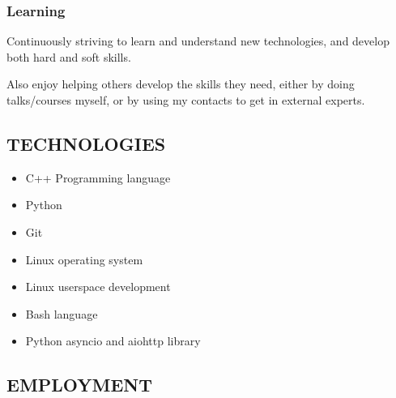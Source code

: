 \documentclass{article}
\begin{document}
\begin{multicols}{2}
\begin{addmargin}[2em]{0em}
    \subsubsection*{Learning}

    \begin{addmargin}[1em]{0em}
      Continuously striving to learn and understand new technologies, and develop both hard
      and soft skills.

      Also enjoy helping others develop the skills they need, either by doing talks/courses
      myself, or by using my contacts to get in external experts.
    \end{addmargin}

  \end{addmargin}

\end{multicols}

\subsection*{TECHNOLOGIES}

\begin{multicols}{2}

  \begin{itemize}
    \item C++ Programming language
    \item Python
    \item Git
    \item Linux operating system
    \item Linux userspace development
    \item Bash language
    \item Python asyncio and aiohttp library
  \end{itemize}
\end{multicols}

\subsection*{EMPLOYMENT}
\end{document}

